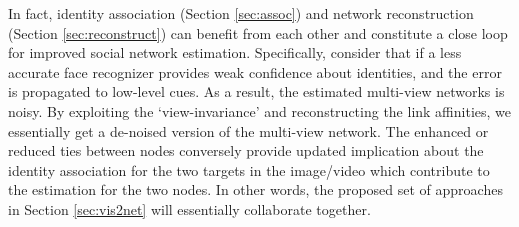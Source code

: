 In fact, identity association (Section \ref{sec:assoc}) and network reconstruction (Section \ref{sec:reconstruct}) can benefit from each other and constitute a close loop for improved social network estimation. Specifically, consider that if a less accurate face recognizer provides weak confidence about identities, and the error is propagated to low-level cues. As a result, the estimated multi-view networks is noisy. By exploiting the `view-invariance' and reconstructing the link affinities, we essentially get a de-noised version of the multi-view network. The enhanced or reduced ties between nodes conversely provide updated implication about the identity association for the two targets in the image/video which contribute to the estimation for the two nodes. In other words, the proposed set of approaches in Section \ref{sec:vis2net} will essentially collaborate together.